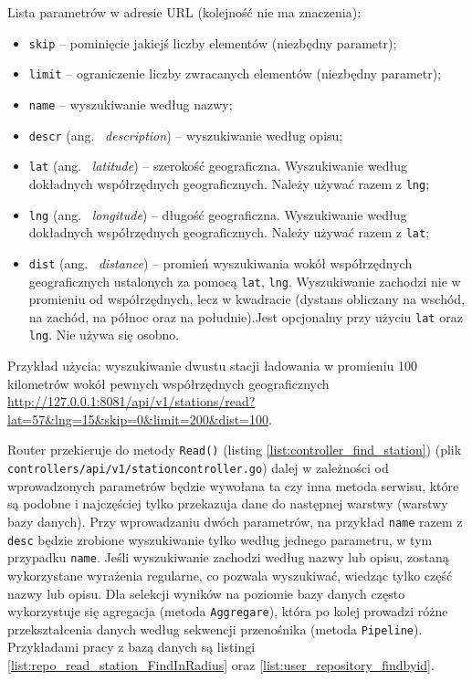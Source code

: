 Lista parametrów w adresie URL (kolejność nie ma znaczenia):
\begin{itemize}
    \item \texttt{skip} -- pominięcie jakiejś liczby elementów (niezbędny parametr);
    \item \texttt{limit} -- ograniczenie liczby zwracanych elementów (niezbędny parametr);
    \item \texttt{name} -- wyszukiwanie według nazwy;
    \item \texttt{descr} (ang. ~\emph{description}) -- wyszukiwanie według opisu;
    \item \texttt{lat} (ang. ~\emph{latitude}) -- szerokość geograficzna. Wyszukiwanie według dokładnych współrzędnych geograficznych. Należy używać razem z \texttt{lng};
    \item \texttt{lng} (ang. ~\emph{longitude}) -- długość geograficzna. Wyszukiwanie według dokładnych współrzędnych geograficznych. Należy używać razem z \texttt{lat};
    \item \texttt{dist} (ang. ~\emph{distance}) -- promień wyszukiwania wokół współrzędnych geograficznych ustalonych za pomocą \texttt{lat}, \texttt{lng}. Wyszukiwanie zachodzi nie w promieniu od współrzędnych, lecz w kwadracie (dystans obliczany na wschód, na zachód, na północ oraz na południe).Jest opcjonalny przy użyciu \texttt{lat} oraz \texttt{lng}. Nie używa się osobno.
\end{itemize}

Przykład użycia: wyszukiwanie dwustu stacji ładowania w promieniu 100 kilometrów wokół pewnych współrzędnych geograficznych \url{http://127.0.0.1:8081/api/v1/stations/read?lat=57&lng=15&skip=0&limit=200&dist=100}.

Router przekieruje do metody \texttt{Read()} (listing \ref{list:controller_find_station}) (plik \texttt{controllers/api/v1/stationcontroller.go}) dalej w zależności od wprowadzonych parametrów będzie wywołana ta czy inna metoda serwisu, które są podobne i najczęściej tylko przekazuja dane do następnej warstwy (warstwy bazy danych).
Przy wprowadzaniu dwóch parametrów, na przykład \texttt{name} razem z \texttt{desc} będzie zrobione wyszukiwanie tylko według jednego parametru, w tym przypadku \texttt{name}.
Jeśli wyszukiwanie zachodzi według nazwy lub opisu, zostaną wykorzystane wyrażenia regularne, co pozwala wyszukiwać, wiedząc tylko część nazwy lub opisu.
Dla selekcji wyników na poziomie bazy danych często wykorzystuje się agregacja (metoda \texttt{Aggregare}), która po kolej prowadzi różne przekształcenia danych według sekwencji przenośnika (metoda \texttt{Pipeline}). Przykładami pracy z bazą danych są listingi \ref{list:repo_read_station_FindInRadius} oraz \ref{list:user_repository_findbyid}.

